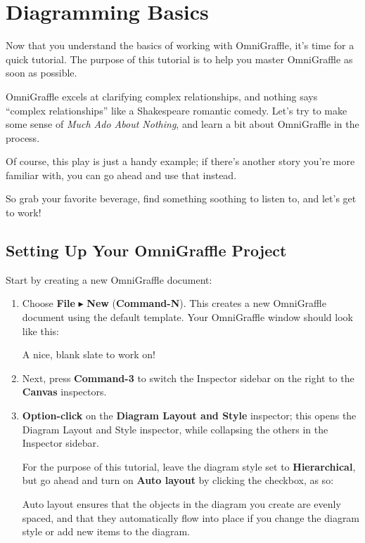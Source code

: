 \documentclass[../main.tex]{subfiles}
\begin{document}
\chapter{Diagramming Basics}

Now that you understand the basics of working with OmniGraffle, it's time for a quick tutorial.
The purpose of this tutorial is to help you master OmniGraffle as soon as possible.

OmniGraffle excels at clarifying complex relationships, and nothing says ``complex
relationships'' like a Shakespeare romantic comedy. Let's try to make some sense of
\textit{Much Ado About Nothing}, and learn a bit about OmniGraffle in the process.


Of course, this play is just a handy example; if there's another story you're more familiar
with, you can go ahead and use that instead.

So grab your favorite beverage, find something soothing to listen to, and let's get to work!

\section{Setting Up Your OmniGraffle Project}

Start by creating a new OmniGraffle document:

\begin{enumerate}
  \item Choose \textbf{File} $\blacktriangleright$ \textbf{New} (\textbf{Command-N}). This
    creates a new OmniGraffle document using the default template. Your OmniGraffle window
    should look like this:


    A nice, blank slate to work on!
  \item Next, press \textbf{Command-3} to switch the Inspector sidebar on the right to the
    \textbf{Canvas} inspectors.
  \item \textbf{Option-click} on the \textbf{Diagram Layout and Style} inspector; this opens the
    Diagram Layout and Style inspector, while collapsing the others in the Inspector sidebar.

    For the purpose of this tutorial, leave the diagram style set to \textbf{Hierarchical}, but go
    ahead and turn on \textbf{Auto layout} by clicking the checkbox, as so:


    Auto layout ensures that the objects in the diagram you create are evenly spaced, and that
    they automatically flow into place if you change the diagram style or add new items to the
    diagram.
\end{enumerate}
\end{document}
